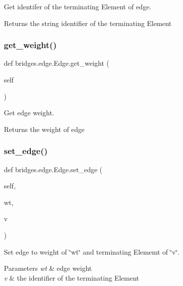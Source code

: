 Get identifer of the terminating Element of edge. 

\begin{DoxyReturn}{Returns}
the string identifier of the terminating Element 
\end{DoxyReturn}
\mbox{\label{classbridges_1_1edge_1_1_edge_a4ba1468a54909bf92ab3cd125f5929b3}} 
\subsubsection{\texorpdfstring{get\+\_\+weight()}{get\_weight()}}
{\footnotesize\ttfamily def bridges.\+edge.\+Edge.\+get\+\_\+weight (\begin{DoxyParamCaption}\item[{}]{self }\end{DoxyParamCaption})}



Get edge weight. 

\begin{DoxyReturn}{Returns}
the weight of edge 
\end{DoxyReturn}
\mbox{\label{classbridges_1_1edge_1_1_edge_a04f1233833cb134ee88a51d9e348450c}} 
\subsubsection{\texorpdfstring{set\+\_\+edge()}{set\_edge()}}
{\footnotesize\ttfamily def bridges.\+edge.\+Edge.\+set\+\_\+edge (\begin{DoxyParamCaption}\item[{}]{self,  }\item[{}]{wt,  }\item[{}]{v }\end{DoxyParamCaption})}



Set edge to weight of \char`\"{}wt\char`\"{} and terminating Elememt of \char`\"{}v\char`\"{}. 


\begin{DoxyParams}{Parameters}
{\em wt} & edge weight \\
\hline
{\em v} & the identifier of the terminating Element \\
\hline
\end{DoxyParams}
\mbox{\label{classbridges_1_1edge_1_1_edge_ad417d82a7b7277f3529667e1e2b280e9}} 
